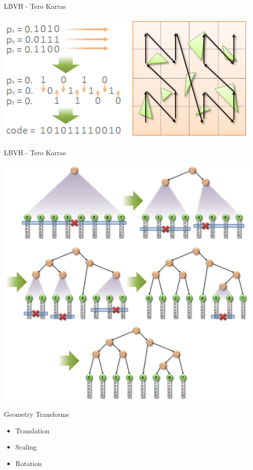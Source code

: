 \documentclass[xcolor=table]{beamer}
\begin{document}
\begin{frame}{LBVH - Tero Karras}

\includegraphics[scale=0.5]{media/fig04-z-curve.png}

\end{frame}

\begin{frame}{LBVH - Tero Karras}

\includegraphics[scale=0.35]{media/fig05-top-down.png}

\end{frame}

\begin{frame}{Geometry Transforms}

\begin{itemize}
	\item Translation
	\item Scaling
	\item Rotation
\end{itemize}

\end{frame}
\end{document}
